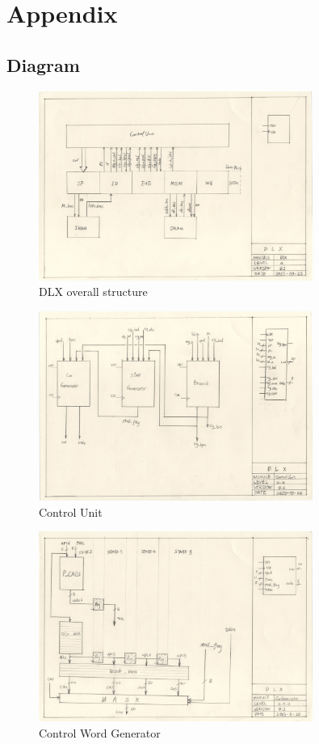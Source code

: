 \chapter[Appendix]{Appendix}
\section[Diagram]{Diagram}
\begin{figure}[Ht]
    \centering
    \includegraphics[width=0.8\textwidth]{fig/dlx.jpg}
    \caption{DLX overall structure}
    \label{fig:dlx}
\end{figure}
\begin{figure}[Ht]
    \centering
    \includegraphics[width=0.8\textwidth]{fig/cu.jpg}
    \caption{Control Unit}
    \label{fig:cu}
\end{figure}
\begin{figure}[Ht]
    \centering
    \includegraphics[width=0.8\textwidth]{fig/cg.jpg}
    \caption{Control Word Generator}
    \label{fig:cg}
\end{figure}
